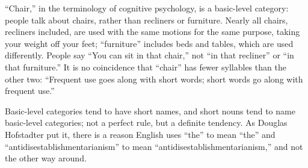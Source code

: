 ``Chair,'' in the terminology of cognitive psychology, is a basic-level category: people talk about chairs, rather than recliners or furniture. Nearly all chairs, recliners included, are used with the same motions for the same purpose, taking your weight off your feet; ``furniture'' includes beds and tables, which are used differently. People say ``You can sit in that chair,'' not ``in that recliner'' or ``in that furniture.''  It is no coincidence that ``chair'' has fewer syllables than the other two: ``Frequent use goes along with short words; short words go along with frequent use.'' 

Basic-level categories tend to have short names, and short nouns tend to name basic-level categories; not a perfect rule, but a definite tendency. As Douglas Hofstadter put it, there is a reason English uses ``the'' to mean ``the'' and ``antidisestablishmentarianism'' to mean ``antidisestablishmentarianism,'' and not the other way around.
